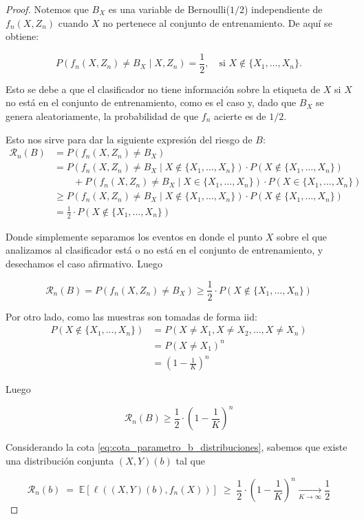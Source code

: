 \documentclass{report}
\begin{document}
\begin{proof}
Notemos que \(B_X\) es una variable de Bernoulli(\(1/2\)) independiente de \(f_n(X, Z_n)\) cuando 
\(X\) no pertenece al conjunto de entrenamiento. De aquí se obtiene:

\[
P(f_n(X, Z_n) \neq B_X \mid X, Z_n) = \frac{1}{2}, \quad \text{si } X \notin \{X_1, \dots, X_n\}.
\]

Esto se debe a que el clasificador no tiene información sobre la etiqueta de \(X\) si \(X\) no está en el conjunto de entrenamiento,
como es el caso y, dado que $B_X$ se genera aleatoriamente, la probabilidad de que $f_n$ acierte es de $1/2$. \newline

Esto nos sirve para
dar la siguiente expresión del riesgo de $B$:\newline
\begin{equation*}
    \begin{aligned}
        \mathcal{R}_n(B) &= P(f_n(X, Z_n) \neq B_X)\\
        &= P(f_n(X, Z_n) \neq B_X \mid X \notin \{X_1, \dots, X_n\}) \cdot P(X \notin \{X_1, \dots, X_n\})\\
        &  \qquad + P(f_n(X, Z_n) \neq B_X \mid X \in \{X_1, \dots, X_n\}) \cdot P(X \in \{X_1, \dots, X_n\})\\
        &\geq P(f_n(X, Z_n) \neq B_X \mid X \notin \{X_1, \dots, X_n\}) \cdot P(X \notin \{X_1, \dots, X_n\})\\
        & = \frac{1}{2} \cdot P(X \notin \{X_1, \dots, X_n\})
    \end{aligned}
\end{equation*}

Donde simplemente separamos los eventos en donde el punto $X$ sobre el que analizamos al clasificador está o no está
en el conjunto de entrenamiento, y desechamos el caso afirmativo. Luego

\[
\mathcal{R}_n(B) = P(f_n(X, Z_n) \neq B_X) \geq \frac{1}{2} \cdot P(X \notin \{X_1, \dots, X_n\})
\]

Por otro lado, como las muestras son tomadas de forma iid:
\[
\begin{aligned}
    P(X \notin \{X_1, \dots, X_n\}) &= P(X\neq X_1, X\neq X_2, \dots, X\neq X_n) \\
   &= P(X\neq X_1)^n \\
   &= \left(1-\frac{1}{K}\right)^n
\end{aligned}
\]

Luego

\[
\mathcal{R}_n(B) \geq \frac{1}{2} \cdot \left(1-\frac{1}{K}\right)^n
\]

Considerando la cota \ref{eq:cota_parametro_b_distribuciones}, sabemos que existe una distribución
conjunta $(X,Y)(b)$ tal que 

\[
\mathcal{R}_n(b) \; =\; \mathbb{E}[\ell((X,Y)(b),f_n(X))] \; \geq \;  \frac{1}{2} \cdot \left(1-\frac{1}{K}\right)^n \xrightarrow[K \to \infty]{} \frac{1}{2}
\]


\end{proof}
\end{document}
